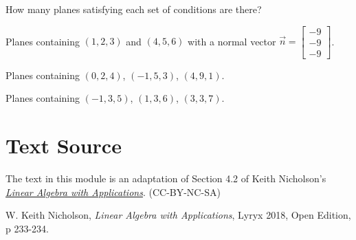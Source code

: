\documentclass{ximera}
\begin{document}
\begin{problem}
How many planes satisfying each set of conditions are there?

\begin{problem}\label{prob:eqplane4}
Planes containing $(1, 2, 3)$ and $(4, 5, 6)$ with a normal vector $\vec{n}=\begin{bmatrix}-9\\-9\\-9\end{bmatrix}$.
\begin{multipleChoice}
 \end{multipleChoice}
\end{problem}

\begin{problem}\label{prob:eqplane5}
Planes containing $(0,2, 4)$, $(-1, 5, 3)$, $(4, 9, 1)$.
\begin{multipleChoice}
 \end{multipleChoice}
\end{problem}

\begin{problem}\label{prob:eqplane6}
Planes containing $(-1, 3, 5)$, $(1, 3, 6)$, $(3, 3, 7)$.
\begin{multipleChoice}
 \end{multipleChoice}
\end{problem}

\end{problem}

\section*{Text Source}
The text in this module is an adaptation of Section 4.2 of Keith Nicholson's \href{https://open.umn.edu/opentextbooks/textbooks/linear-algebra-with-applications}{\it Linear Algebra with Applications}. (CC-BY-NC-SA)

W. Keith Nicholson, {\it Linear Algebra with Applications}, Lyryx 2018, Open Edition, p 233-234.
\end{document}

